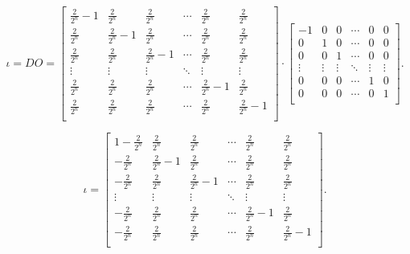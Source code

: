 \begin{equation}
    \iota = DO =
    \begin{bmatrix}
        \frac{2}{2^n}-1 & \frac{2}{2^n} & \frac{2}{2^n} & \cdots  & \frac{2}{2^n} & \frac{2}{2^n}\\ 
        \frac{2}{2^n} & \frac{2}{2^n}-1 & \frac{2}{2^n} & \cdots  & \frac{2}{2^n} & \frac{2}{2^n}\\
        \frac{2}{2^n} & \frac{2}{2^n} & \frac{2}{2^n}-1 & \cdots  & \frac{2}{2^n} & \frac{2}{2^n} \\
        \vdots & \vdots & \vdots & \ddots & \vdots & \vdots \\
        \frac{2}{2^n} & \frac{2}{2^n} & \frac{2}{2^n} & \cdots  & \frac{2}{2^n}-1 & \frac{2}{2^n} \\
        \frac{2}{2^n} & \frac{2}{2^n} & \frac{2}{2^n} & \cdots  & \frac{2}{2^n} & \frac{2}{2^n} -1 \\
    \end{bmatrix}\cdot
    \begin{bmatrix}
        -1 & 0 & 0 & \cdots  & 0 & 0\\ 
        0 & 1 & 0 & \cdots  & 0 & 0\\
        0 & 0 & 1 & \cdots  & 0 & 0 \\
        \vdots & \vdots & \vdots & \ddots & \vdots & \vdots \\
        0 & 0 & 0 & \cdots  & 1 & 0 \\
        0 & 0 & 0 & \cdots  & 0 & 1 \\

    \end{bmatrix}.
\end{equation}

\begin{equation} \label{one_grover_iteration_matrix}
    \iota =
    \begin{bmatrix}
        
        1-\frac{2}{2^n} & \frac{2}{2^n} & \frac{2}{2^n} & \cdots  & \frac{2}{2^n} & \frac{2}{2^n}\\ 
        -\frac{2}{2^n} & \frac{2}{2^n}-1 & \frac{2}{2^n} & \cdots  & \frac{2}{2^n} & \frac{2}{2^n}\\
        -\frac{2}{2^n} & \frac{2}{2^n} & \frac{2}{2^n}-1 & \cdots  & \frac{2}{2^n} & \frac{2}{2^n} \\
        \vdots & \vdots & \vdots & \ddots & \vdots & \vdots \\
        -\frac{2}{2^n} & \frac{2}{2^n} & \frac{2}{2^n} & \cdots  & \frac{2}{2^n}-1 & \frac{2}{2^n} \\
        -\frac{2}{2^n} & \frac{2}{2^n} & \frac{2}{2^n} & \cdots  & \frac{2}{2^n} & \frac{2}{2^n} -1 \\ 
   
    \end{bmatrix}.
\end{equation}

